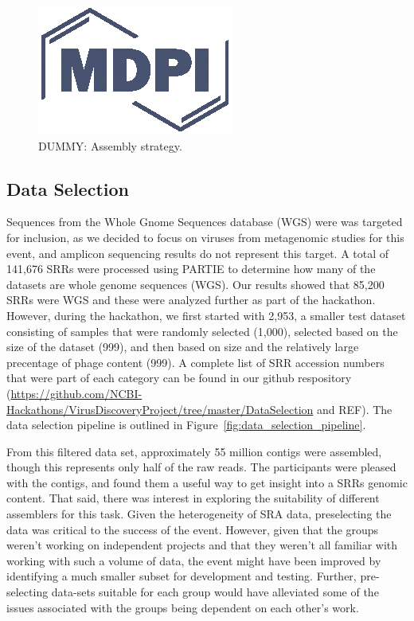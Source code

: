   \begin{figure}
    \centering
    \includegraphics{Definitions/logo-mdpi}
    \caption{DUMMY: Assembly strategy.
            \label{fig:asm_strategy}}
  \end{figure}

  \subsection{Data Selection}
  Sequences from the Whole Gnome Sequences database (WGS) were was targeted for
  inclusion, as we decided to focus on viruses from metagenomic studies for
  this event, and amplicon sequencing results do not represent this target. A
  total of 141,676 SRRs were processed using PARTIE \cite{Torres2017} to
  determine how many of the datasets are whole genome sequences (WGS). Our
  results showed that 85,200 SRRs were WGS and these were analyzed further as
  part of the hackathon. However, during the hackathon, we first started with
  2,953, a smaller test dataset consisting of samples that were randomly
  selected (1,000), selected based on the size of the dataset (999), and then
  based on size and the relatively large precentage of phage content (999). A
  complete list of SRR accession numbers that were part of each category can be
  found in our github respository
  (\url{https://github.com/NCBI-Hackathons/VirusDiscoveryProject/tree/master/DataSelection}
  and REF). The data selection pipeline is outlined in
  Figure~\ref{fig:data_selection_pipeline}.

  From this filtered data set, approximately 55 million contigs were assembled,
  though this represents only half of the raw reads. The participants were
  pleased with the contigs, and found them a useful way to get insight into a
  SRRs genomic content. That said, there was interest in exploring the
  suitability of different assemblers for this task. Given the heterogeneity of
  SRA data, preselecting the data was critical to the success of the event.
  However, given that the groups weren't working on independent projects and
  that they weren't all familiar with working with such a volume of data, the
  event might have been improved by identifying a much smaller subset for
  development and testing. Further, pre-selecting data-sets suitable for each
  group would have alleviated some of the issues associated with the groups
  being dependent on each other's work.

